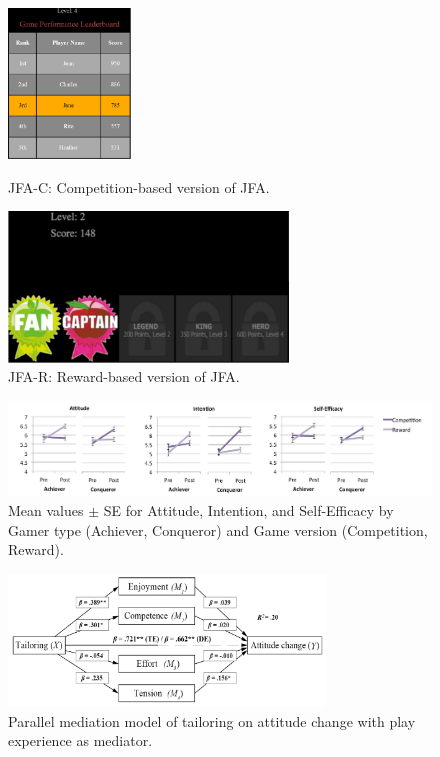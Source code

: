 \documentclass[11pt]{article}
\begin{document}
\begin{figure}[H]
\centering
  \includegraphics[height=4cm]{img/orji2017-junk-food-aliens-competition.png}
  \caption{JFA-C: Competition-based version of JFA.}\label{fig:orji2017-junk-food-aliens-competition}
\endminipage\hfill
{}%
\centering
  \includegraphics[height=4cm]{img/orji2017-junk-food-aliens-reward.png}
  \caption{JFA-R: Reward-based version of JFA.}\label{fig:orji2017-junk-food-aliens-reward}
\endminipage
\end{figure}


\begin{figure}[H]
\centering
\includegraphics[width=\textwidth]{img/orji2017-tailoring-results.png} 
\caption{Mean values $\pm$ SE for Attitude, Intention, and Self-Efficacy by Gamer type (Achiever, Conqueror) and Game version (Competition, Reward).}\label{fig:orji2017-tailoring-results}
\end{figure}

\begin{figure}[H]
\centering
\includegraphics[width=0.75\textwidth]{img/orji2017-tailoring-mediation-results.png} 
\caption{Parallel mediation model of tailoring on attitude change with play experience as mediator.}\label{fig:orji2017-tailoring-mediation-results}
\end{figure}




\newpage
\small

\normalsize
\end{document}
